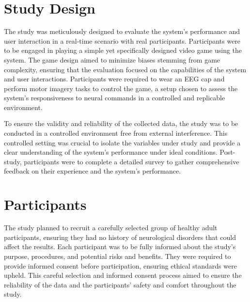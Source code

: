 \section{Study Design}
The study was meticulously designed to evaluate the system's performance and user interaction in a real-time scenario with real participants. Participants were to be engaged in playing a simple yet specifically designed video game using the system. The game design aimed to minimize biases stemming from game complexity, ensuring that the evaluation focused on the capabilities of the system and user interactions. Participants were required to wear an EEG cap and perform motor imagery tasks to control the game, a setup chosen to assess the system's responsiveness to neural commands in a controlled and replicable environment.

To ensure the validity and reliability of the collected data, the study was to be conducted in a controlled environment free from external interference. This controlled setting was crucial to isolate the variables under study and provide a clear understanding of the system's performance under ideal conditions. Post-study, participants were to complete a detailed survey to gather comprehensive feedback on their experience and the system's performance.

\section{Participants}
The study planned to recruit a carefully selected group of healthy adult participants, ensuring they had no history of neurological disorders that could affect the results. 
Each participant was to be fully informed about the study's purpose, procedures, and potential risks and benefits. 
They were required to provide informed consent before participation, ensuring ethical standards were upheld. 
This careful selection and informed consent process aimed to ensure the reliability of the data and the participants' safety and comfort throughout the study.

